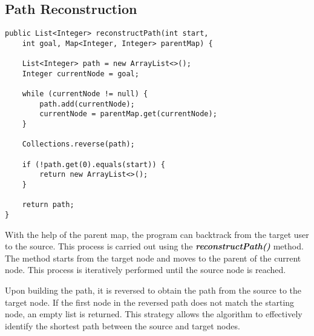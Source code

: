 \subsection*{\textbf{Path Reconstruction}}
\begin{lstlisting}
public List<Integer> reconstructPath(int start, 
    int goal, Map<Integer, Integer> parentMap) {
    
    List<Integer> path = new ArrayList<>();
    Integer currentNode = goal;

    while (currentNode != null) {
        path.add(currentNode);
        currentNode = parentMap.get(currentNode);
    }

    Collections.reverse(path);

    if (!path.get(0).equals(start)) {
        return new ArrayList<>();
    }

    return path;
}
\end{lstlisting}
With the help of the parent map, the program can backtrack from the target user to the source. This process is carried out using the \textit{\textbf{reconstructPath()}} method. The method starts from the target node and moves to the parent of the current node. This process is iteratively performed until the source node is reached.

Upon building the path, it is reversed to obtain the path from the source to the target node. If the first node in the reversed path does not match the starting node, an empty list is returned. This strategy allows the algorithm to effectively identify the shortest path between the source and target nodes.\cite{simic_tracing_2023}
